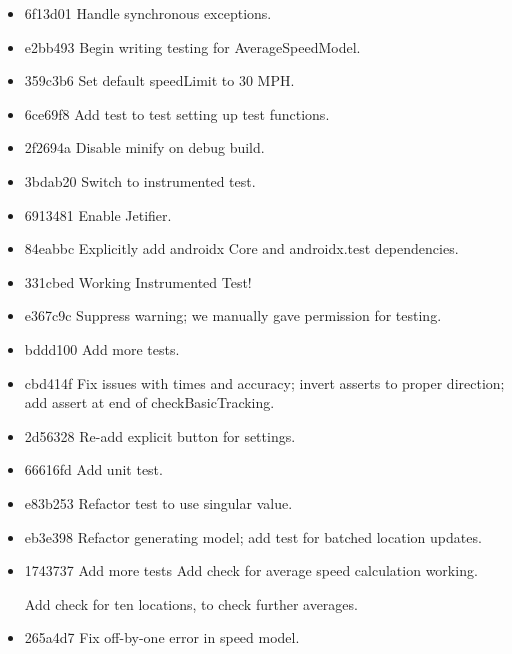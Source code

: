 \documentclass[11pt, a4paper, notitlepage]{report}
\begin{document}
\begin{itemize}
	\item 6f13d01 Handle synchronous exceptions. 
	\item e2bb493 Begin writing testing for AverageSpeedModel. 
	\item 359c3b6 Set default speedLimit to 30 MPH. 
	\item 6ce69f8 Add test to test setting up test functions. 
	\item 2f2694a Disable minify on debug build. 
	\item 3bdab20 Switch to instrumented test. 
	\item 6913481 Enable Jetifier. 
	\item 84eabbc Explicitly add androidx Core and androidx.test dependencies. 
	\item 331cbed Working Instrumented Test! 
	\item e367c9c Suppress warning; we manually gave permission for testing. 
	\item bddd100 Add more tests. 
	\item cbd414f Fix issues with times and accuracy; invert asserts to proper direction; add assert at end of checkBasicTracking. 
	\item 2d56328 Re-add explicit button for settings.
	\item 66616fd Add unit test. 
	\item e83b253 Refactor test to use singular value. 
	\item eb3e398 Refactor generating model; add test for batched location updates. 
	\item 1743737 Add more tests Add check for average speed calculation working.
	
	Add check for ten locations, to check further averages.
	
	\item 265a4d7 Fix off-by-one error in speed model.
\end{itemize}


\end{document}

